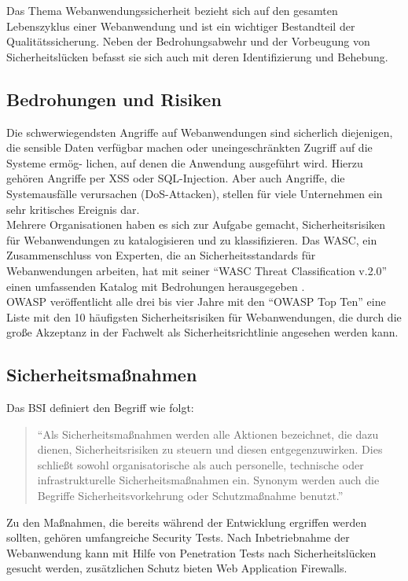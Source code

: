 \documentclass[12pt,oneside,a4paper,parskip,pointlessnumbers]{scrbook}
\begin{document}
  Das Thema Webanwendungssicherheit bezieht sich auf den gesamten Lebenszyklus einer Webanwendung und ist ein wichtiger Bestandteil der Qualitätssicherung. Neben der Bedrohungsabwehr und der Vorbeugung von Sicherheitslücken befasst sie sich auch mit deren Identifizierung und Behebung. \cite{BSI}

  \subsection{Bedrohungen und Risiken}
  Die schwerwiegendsten Angriffe auf Webanwendungen sind sicherlich diejenigen, die sensible Daten verfügbar machen oder uneingeschränkten Zugriff auf die Systeme ermög- lichen, auf denen die Anwendung ausgeführt wird. Hierzu gehören Angriffe per \ac{XSS} oder SQL-Injection. Aber auch Angriffe, die Systemausfälle verursachen (\ac{DoS}-Attacken), stellen für viele Unternehmen ein sehr kritisches Ereignis dar.\\
  Mehrere Organisationen haben es sich zur Aufgabe gemacht, Sicherheitsrisiken für Webanwendungen zu katalogisieren und zu klassifizieren. Das \ac{WASC}, ein Zusammenschluss von Experten, die an Sicherheitsstandards für Webanwendungen arbeiten, hat mit seiner ``WASC Threat Classification v.2.0'' einen umfassenden Katalog mit Bedrohungen herausgegeben \cite{WASC}.\\
  OWASP veröffentlicht alle drei bis vier Jahre mit den ``OWASP Top Ten'' \cite{OWASPtop10} eine Liste mit den 10 häufigsten Sicherheitsrisiken für Webanwendungen, die durch die große Akzeptanz in der Fachwelt als Sicherheitsrichtlinie angesehen werden kann.


  \subsection{Sicherheitsmaßnahmen}
  Das BSI definiert den Begriff wie folgt:
    \begin{quote} ``Als Sicherheitsmaßnahmen werden alle Aktionen bezeichnet, die dazu dienen, Sicherheitsrisiken zu steuern und diesen entgegenzuwirken. Dies schließt sowohl organisatorische als auch personelle, technische oder infrastrukturelle Sicherheitsmaßnahmen ein. Synonym werden auch die Begriffe Sicherheitsvorkehrung oder Schutzmaßnahme benutzt.'' \cite[S.107-108]{BSI2}\end{quote}

 Zu den Maßnahmen, die bereits während der Entwicklung ergriffen werden sollten, gehören umfangreiche Security Tests. Nach Inbetriebnahme der Webanwendung kann mit Hilfe von Penetration Tests nach Sicherheitslücken gesucht werden, zusätzlichen Schutz bieten Web Application Firewalls.
\end{document}
